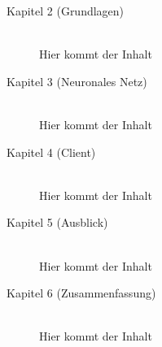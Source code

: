 \begin{description}

    \item[Kapitel 2 (Grundlagen)]\hfill \\
    Hier kommt der Inhalt

    \item[Kapitel 3 (Neuronales Netz)]\hfill \\
    Hier kommt der Inhalt

    \item[Kapitel 4 (Client)]\hfill \\
    Hier kommt der Inhalt

    \item[Kapitel 5 (Ausblick)]\hfill \\
    Hier kommt der Inhalt

    \item[Kapitel 6 (Zusammenfassung)]\hfill \\
    Hier kommt der Inhalt

\end{description}